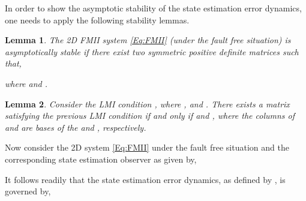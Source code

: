 \documentclass[journal,12pt,draftcls,onecolumn]{IEEEtran}
\newcommand{\bs}{\begin{small}}
\newcommand{\es}{\end{small}}
\def\QEDclosed{\hfill\IEEEQEDclosed}
\renewcommand{\qed}{\QEDclosed}
\newtheorem{lemma}{Lemma}
\begin{document}
In order to show the asymptotic stability of the state estimation error dynamics, one needs to apply the following stability lemmas.

\begin{lemma}\label{Lem:2DLyapunov}\cite{2DLyapunov}
	The 2D FMII system \eqref{Eq:FMII} (under the fault free situation) is asymptotically stable if there exist two symmetric positive definite matrices  such that,
	
	where  and .\qed
\end{lemma}
\begin{lemma}\label{Lem:2DLMIBasic}\cite{LMI1D}
	Consider the LMI condition ,
	where ,  and . There exists a matrix  satisfying the previous LMI condition if and only if
	 and , where the columns of  and  are bases of the  and , respectively.\qed
\end{lemma}


Now consider the 2D system \eqref{Eq:FMII} under the fault free situation and the corresponding  state estimation observer as given by,
\bs

\es
It follows readily that the state estimation error dynamics, as defined by , is governed  by,
\end{document}
